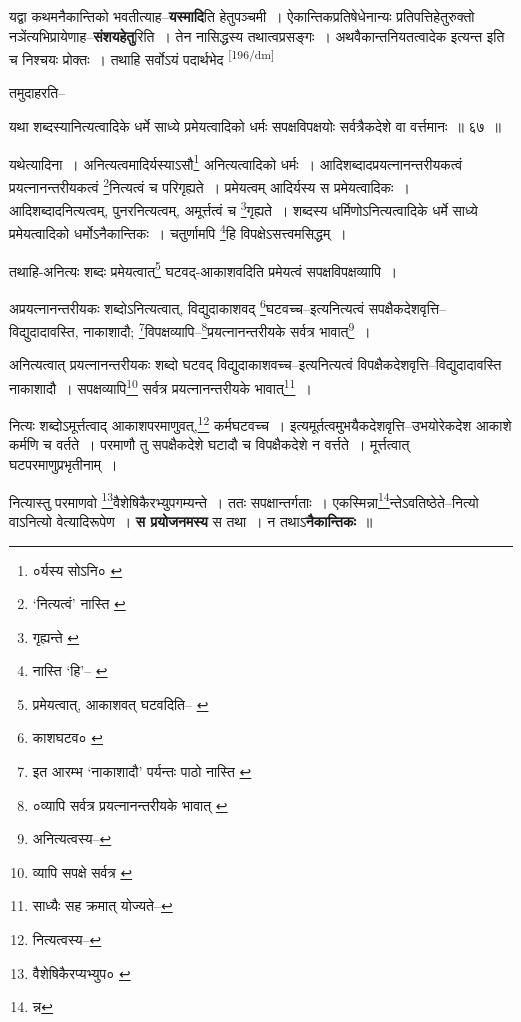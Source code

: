 \documentclass[article,12pt,a4paper]{memoir}
\begin{document}
	  \pstart यद्वा कथमनैकान्तिको भवतीत्याह--\textbf{यस्मादि}ति हेतुपञ्चमी । ऐकान्तिकप्रतिषेधेनान्यः प्रतिपत्तिहेतुरुक्तो नञेंत्यभिप्रायेणाह--\textbf{संशयहेतु}रिति । तेन नासिद्धस्य तथात्वप्रसङ्गः । अथवैकान्तनियतत्वादेक इत्यन्त इति च निश्चयः प्रोक्तः । तथाहि सर्वोऽयं पदार्थभेद  \leavevmode\textsuperscript{\rmlatinfont\tiny [196/dm]} 
	  
	तमुदाहरति-- 
	  
	यथा शब्दस्यानित्यत्वादिके धर्मे साध्ये प्रमेयत्वादिको धर्मः सपक्षविपक्षयोः सर्वत्रैकदेशे वा वर्त्तमानः ॥ ६७ ॥ 
	  
	यथेत्यादिना । अनित्यत्वमादिर्यस्याऽसौ\footnote{०र्यस्य सोऽनि० \cite{dp-msA} \cite{dp-msB} \cite{dp-msD} \cite{dp-edP} \cite{dp-edH} \cite{dp-edE} \cite{dp-edN}} अनित्यत्वादिको धर्मः । आदिशब्दादप्रयत्नानन्तरीयकत्वं प्रयत्नानन्तरीयकत्वं \footnote{‘नित्यत्वं’ नास्ति \cite{dp-msB}}नित्यत्वं च परिगृह्यते । प्रमेयत्वम् आदिर्यस्य स प्रमेयत्वादिकः । आदिशब्दादनित्यत्वम्, पुनरनित्यत्वम्, अमूर्त्तत्वं च \footnote{गृह्यन्ते \cite{dp-msB}}गृह्यते । शब्दस्य धर्मिणोऽनित्यत्वादिके धर्मे साध्ये प्रमेयत्वादिको धर्मोऽनैकान्तिकः । चतुर्णामपि \footnote{नास्ति ‘हि’--\cite{dp-msA} \cite{dp-msB} \cite{dp-edP} \cite{dp-edH} \cite{dp-edN}}हि विपक्षेऽसत्त्वमसिद्धम् । 
	  
	तथाहि-अनित्यः शब्दः प्रमेयत्वात्\footnote{प्रमेयत्वात्, आकाशवत् घटवदिति--\cite{dp-msA} \cite{dp-msB} \cite{dp-msD} \cite{dp-edP} \cite{dp-edH} \cite{dp-edE} \cite{dp-edN}} घटवद्-आकाशवदिति प्रमेयत्वं सपक्षविपक्षव्यापि । 
	  
	अप्रयत्नानन्तरीयकः शब्दोऽनित्यत्वात्, विद्युदाकाशवद् \footnote{काशघटव० \cite{dp-msA}}घटवच्च--इत्यनित्यत्वं सपक्षैकदेशवृत्ति--विद्युदादावस्ति, नाकाशादौ; \footnote{इत आरम्भ ‘नाकाशादौ’ पर्यन्तः पाठो नास्ति \cite{dp-msB}}विपक्षव्यापि--\footnote{०व्यापि सर्वत्र प्रयत्नानन्तरीयके भावात् \cite{dp-msC}}प्रयत्नानन्तरीयके सर्वत्र भावात्\footnote{अनित्यत्वस्य--\cite{dp-msD-n}} । 
	  
	अनित्यत्वात् प्रयत्नानन्तरीयकः शब्दो घटवद् विद्युदाकाशवच्च--इत्यनित्यत्वं विपक्षैकदेशवृत्ति--विद्युदादावस्ति नाकाशादौ । सपक्षव्यापि\footnote{व्यापि सपक्षे सर्वत्र \cite{dp-msC} \cite{dp-msD}} सर्वत्र प्रयत्नानन्तरीयके भावात्\footnote{साध्यैः सह क्रमात् योज्यते--\cite{dp-msD-n}} । 
	  
	नित्यः शब्दोऽमूर्त्तत्वाद् आकाशपरमाणुवत्,\footnote{नित्यत्वस्य--\cite{dp-msD-n}} कर्मघटवच्च । इत्यमूर्तत्वमुभयैकदेशवृत्ति--उभयोरेकदेश आकाशे कर्मणि च वर्तते । परमाणौ तु सपक्षैकदेशे घटादौ च विपक्षैकदेशे न वर्त्तते । मूर्त्तत्वात् घटपरमाणुप्रभृतीनाम् । 
	  
	नित्यास्तु परमाणवो \footnote{वैशेषिकैरप्यभ्युप० \cite{dp-msC}}वैशेषिकैरभ्युपगम्यन्ते । ततः सपक्षान्तर्गताः । एकस्मिन्ना\footnote{न्न}न्तेऽवतिष्ठेते--नित्यो वाऽनित्यो वेत्यादिरूपेण । \textbf{स प्रयोजनमस्य} स तथा । न तथाऽ\textbf{नैकान्तिकः} ॥
	\pend
      
\end{document}
